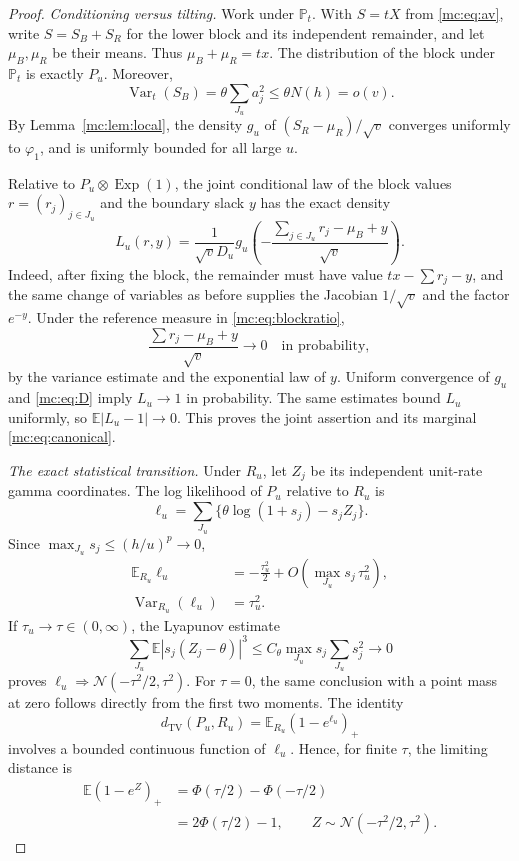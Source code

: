 \begin{proof}
\emph{Conditioning versus tilting.}
Work under $\mathbb P_t$.  With $S=tX$ from \eqref{mc:eq:av}, write
$S=S_B+S_R$ for the lower block and its independent remainder, and let
$\mu_B,\mu_R$ be their means.  Thus $\mu_B+\mu_R=tx$.
The distribution of the block under $\mathbb P_t$ is exactly $P_u$.
Moreover,
\[
 \operatorname{Var}_t(S_B)=\theta\sum_{J_u}a_j^2
 \leq\theta N(h)=o(v).
\]
By Lemma~\ref{mc:lem:local}, the density $g_u$ of
$(S_R-\mu_R)/\sqrt v$ converges uniformly to $\varphi_1$, and is
uniformly bounded for all large $u$.

Relative to $P_u\otimes\operatorname{Exp}(1)$, the joint conditional
law of the block values $r=(r_j)_{j\in J_u}$ and the boundary slack $y$
has the exact density
\begin{equation}\label{mc:eq:blockratio}
 L_u(r,y)=\frac1{\sqrt vD_u}
 g_u\left(-\frac{\sum_{j\in J_u}r_j-\mu_B+y}{\sqrt v}\right).
\end{equation}
Indeed, after fixing the block, the remainder must have value
$tx-\sum r_j-y$, and the same change of variables as before supplies
the Jacobian $1/\sqrt v$ and the factor $e^{-y}$.
Under the reference measure in \eqref{mc:eq:blockratio},
\[
 \frac{\sum r_j-\mu_B+y}{\sqrt v}\longrightarrow0
 \quad\text{in probability},
\]
by the variance estimate and the exponential law of $y$.
Uniform convergence of $g_u$ and \eqref{mc:eq:D} imply
$L_u\to1$ in probability.  The same estimates bound $L_u$ uniformly,
so $\mathbb E|L_u-1|\to0$.  This proves the joint assertion and its
marginal \eqref{mc:eq:canonical}.

\emph{The exact statistical transition.}
Under $R_u$, let $Z_j$ be its independent unit-rate gamma coordinates.
The log likelihood of $P_u$ relative to $R_u$ is
\begin{equation}\label{mc:eq:LAN}
 \ell_u=\sum_{J_u}\{\theta\log(1+s_j)-s_jZ_j\}.
\end{equation}
Since $\max_{J_u}s_j\leq(h/u)^p\to0$,
\begin{align*}
 \mathbb E_{R_u}\ell_u
   &=-\frac{\tau_u^2}{2}
     +O\left(\max_{J_u}s_j\,\tau_u^2\right),\\
 \operatorname{Var}_{R_u}(\ell_u)&=\tau_u^2.
\end{align*}
If $\tau_u\to\tau\in(0,\infty)$, the Lyapunov estimate
\[
 \sum_{J_u}\mathbb E|s_j(Z_j-\theta)|^3
 \leq C_\theta\max_{J_u}s_j\sum_{J_u}s_j^2\longrightarrow0
\]
proves
$\ell_u\Rightarrow\mathcal N(-\tau^2/2,\tau^2)$.
For $\tau=0$, the same conclusion with a point mass at zero follows
directly from the first two moments.
The identity
\[
 d_{\mathrm{TV}}(P_u,R_u)
 =\mathbb E_{R_u}(1-e^{\ell_u})_+
\]
involves a bounded continuous function of $\ell_u$.  Hence, for finite
$\tau$, the limiting distance is
\begin{align*}
 \mathbb E(1-e^Z)_+
 &=\Phi(\tau/2)-\Phi(-\tau/2)\\
 &=2\Phi(\tau/2)-1,
 \qquad Z\sim\mathcal N(-\tau^2/2,\tau^2).
\end{align*}


\end{proof}

